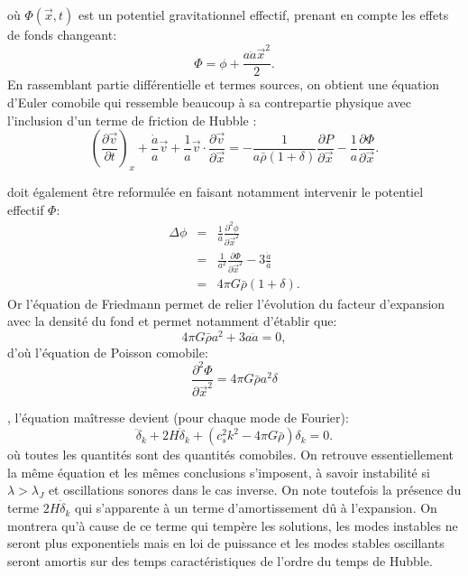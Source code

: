  où $\Phi(\vec x,t)$ est un potentiel gravitationnel effectif, prenant en compte les effets de fonds changeant:
 \begin{equation}
 \Phi= \phi+\frac{a\ddot a {\vec x}^2}{2}.
 \end{equation}
En rassemblant partie différentielle et termes sources, on obtient une équation d'Euler comobile qui ressemble beaucoup à sa contrepartie physique avec l'inclusion d'un terme de friction de Hubble :
\begin{equation}
\left(\frac{\partial \vec v}{\partial t}\right)_x +\frac{\dot a}{a}\vec v+\frac{1}{a}\vec v \cdot \frac{\partial \vec v}{\partial \vec x}=-\frac{1}{a\bar \rho (1+\delta)}\frac{\partial P}{\partial \vec x}-\frac{1}{a}\frac{\partial \Phi}{\partial \vec x}.
\end{equation}

 doit également être reformulée en faisant notamment intervenir le potentiel effectif $\Phi$:
\begin{eqnarray}
\Delta \phi &=&\frac{1}{a}\frac{\partial^2 \phi}{\partial \vec x^2}\\
&=&\frac{1}{a^2}\frac{\partial \Phi}{\partial \vec x^2}-3\frac{\ddot a}{a}\\
&=&4\pi G \bar \rho(1+\delta).
\end{eqnarray}
Or l'équation de Friedmann permet de relier l'évolution du facteur d'expansion avec la densité du fond et permet notamment d'établir que:
\begin{equation}
4\pi G \bar \rho a^2+3 a \ddot a=0,
\end{equation}
 d'où l'équation de Poisson comobile:
 \begin{equation}
 \frac{\partial^2 \Phi}{\partial \vec x^2}=4\pi G \bar \rho a^2 \delta
 \end{equation}
 
 , l'équation maîtresse devient (pour chaque mode de Fourier):
 \begin{equation}
  \ddot \delta_k +2H\dot \delta_k+ (c_s^2k ^2-4\pi G \bar \rho) \delta_k= 0.
  \label{e:epert}
 \end{equation}
 où toutes les quantités sont des quantités comobiles. On retrouve essentiellement la même équation et les mêmes conclusions s'imposent, à savoir instabilité si $\lambda >\lambda_J$ et oscillations sonores dans le cas inverse. On note toutefois la présence du terme $2H\dot \delta_k$ qui s'apparente à un terme d'amortissement dû à l'expansion. On montrera qu'à cause de ce terme qui tempère les solutions, les modes instables ne seront plus exponentiels mais en loi de puissance et les modes stables oscillants seront amortis sur des temps caractéristiques de l'ordre du temps de Hubble.
 
